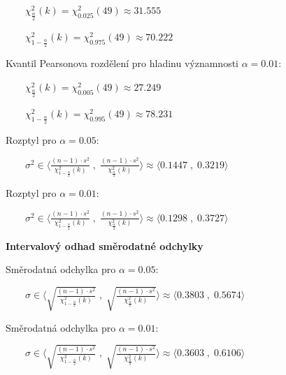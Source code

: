 \documentclass[11pt, a4paper, titlepage]{article}
\begin{document}
${\displaystyle \qquad \chi_{\frac{\alpha}{2}}^2(k) = \chi_{0.025}^2(49) \approx 31.555}$
\medskip

${\displaystyle \qquad \chi_{1 - \frac{\alpha}{2}}^2(k) = \chi_{0.975}^2(49) \approx  70.222}$
\medskip

Kvantil Pearsonova rozdělení pro hladinu významnosti ${\displaystyle \alpha = 0.01}$:
\medskip

${\displaystyle \qquad \chi_{\frac{\alpha}{2}}^2(k) = \chi_{0.005}^2(49) \approx 27.249}$
\medskip

${\displaystyle \qquad \chi_{1 - \frac{\alpha}{2}}^2(k) = \chi_{0.995}^2(49) \approx  78.231}$
\medskip

Rozptyl pro ${\displaystyle \alpha = 0.05 :}$
\medskip


${\displaystyle \qquad \sigma^2 \in \bigg\langle \frac{(n - 1) \cdot s^2}{\chi_{1 - \frac{\alpha}{2}}^2(k)} \;,\; \frac{(n - 1) \cdot s^2}{\chi_{\frac{\alpha}{2}}^2(k)} \bigg\rangle \approx \bigg\langle 0.1447 \;,\; 0.3219 \bigg\rangle}$
\medskip

Rozptyl pro ${\displaystyle \alpha = 0.01 :}$
\medskip


${\displaystyle \qquad \sigma^2 \in \bigg\langle \frac{(n - 1) \cdot s^2}{\chi_{1 - \frac{\alpha}{2}}^2(k)} \;,\; \frac{(n - 1) \cdot s^2}{\chi_{\frac{\alpha}{2}}^2(k)} \bigg\rangle \approx \bigg\langle 0.1298 \;,\; 0.3727 \bigg\rangle}$
\newpage



\textbf{Intervalový odhad směrodatné odchylky}
\medskip

Směrodatná odchylka pro ${\displaystyle \alpha = 0.05 :}$
\medskip


${\displaystyle \qquad \sigma \in \bigg\langle \sqrt{\frac{(n - 1) \cdot s^2}{\chi_{1 - \frac{\alpha}{2}}^2(k)}} \;,\; \sqrt{\frac{(n - 1) \cdot s^2}{\chi_{\frac{\alpha}{2}}^2(k)}} \bigg\rangle \approx \bigg\langle 0.3803 \;,\; 0.5674 \bigg\rangle}$
\bigskip

Směrodatná odchylka pro ${\displaystyle \alpha = 0.01 :}$
\medskip


${\displaystyle \qquad \sigma \in \bigg\langle \sqrt{\frac{(n - 1) \cdot s^2}{\chi_{1 - \frac{\alpha}{2}}^2(k)}} \;,\; \sqrt{\frac{(n - 1) \cdot s^2}{\chi_{\frac{\alpha}{2}}^2(k)}} \bigg\rangle \approx \bigg\langle 0.3603 \;,\; 0.6106 \bigg\rangle}$
\bigskip
\medskip
\end{document}
